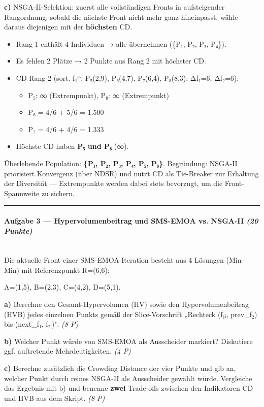\documentclass[11pt, a4paper]{article}
\begin{document}
\textbf{c)} NSGA-II-Selektion: zuerst alle vollständigen Fronts in aufsteigender Rangordnung; sobald die nächste Front nicht mehr ganz hineinpasst, wähle daraus diejenigen mit der \textbf{höchsten} CD.


\begin{itemize}
  \item Rang 1 enthält 4 Individuen → alle übernehmen (\{P₁, P₂, P₃, P₄\}).
  \item Es fehlen 2 Plätze → 2 Punkte aus Rang 2 mit höchster CD.
  \item CD Rang 2 (sort. f₁↑: P₅(2,9), P₆(4,7), P₇(6,4), P₈(8,3); Δf₁=6, Δf₂=6):
\begin{itemize}
  \item P₅: ∞ (Extrempunkt), P₈: ∞ (Extrempunkt)
  \item P₆ = 4/6 + 5/6 = 1.500
  \item P₇ = 4/6 + 4/6 = 1.333
\end{itemize}
  \item Höchste CD haben \textbf{P₅ und P₈} (∞).
\end{itemize}

Überlebende Population: \textbf{\{P₁, P₂, P₃, P₄, P₅, P₈\}}. Begründung: NSGA-II priorisiert Konvergenz (über NDSR) und nutzt CD als Tie-Breaker zur Erhaltung der Diversität — Extrempunkte werden dabei stets bevorzugt, um die Front-Spannweite zu sichern.



\noindent\textcolor{rulegray}{\rule{\linewidth}{0.4pt}}


\paragraph{Aufgabe 3 — Hypervolumenbeitrag und SMS-EMOA vs. NSGA-II \textit{(20 Punkte)}}\mbox{}\\[2pt]

Die aktuelle Front einer SMS-EMOA-Iteration besteht aus 4 Lösungen (Min–Min) mit Referenzpunkt R=(6,6):


A=(1,5), B=(2,3), C=(4,2), D=(5,1).


\textbf{a)} Berechne den Gesamt-Hypervolumen (HV) sowie den Hypervolumenbeitrag (HVB) jedes einzelnen Punkts gemäß der Slice-Vorschrift „Rechteck (f₁ᵢ, prev\_f₂) bis (next\_f₁, f₂ᵢ)". \textit{(8 P)}


\textbf{b)} Welcher Punkt würde von SMS-EMOA als Ausscheider markiert? Diskutiere ggf. auftretende Mehrdeutigkeiten. \textit{(4 P)}


\textbf{c)} Berechne zusätzlich die Crowding Distance der vier Punkte und gib an, welcher Punkt durch reines NSGA-II als Ausscheider gewählt würde. Vergleiche das Ergebnis mit b) und benenne \textbf{zwei} Trade-offs zwischen den Indikatoren CD und HVB aus dem Skript. \textit{(8 P)}
\end{document}
